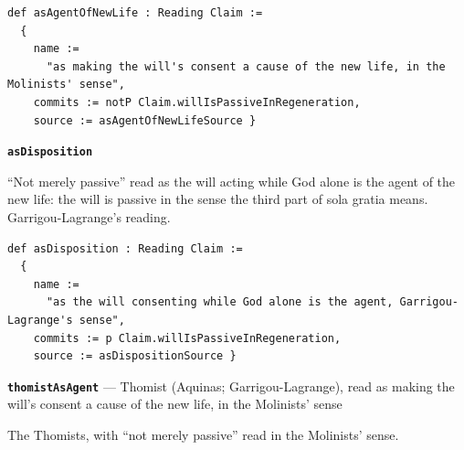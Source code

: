 \documentclass[11pt]{article}
\begin{document}
{\small\begin{verbatim}
def asAgentOfNewLife : Reading Claim :=
  {
    name :=
      "as making the will's consent a cause of the new life, in the Molinists' sense",
    commits := notP Claim.willIsPassiveInRegeneration,
    source := asAgentOfNewLifeSource }
\end{verbatim}}
\par\medskip\noindent\textbf{\texttt{as\allowbreak{}Disposition}}\par\nobreak\noindent
“Not merely passive” read as the will acting while God alone is the agent of the new life: the will is passive in the sense the third part of sola gratia means. Garrigou-Lagrange’s reading.

{\small\begin{verbatim}
def asDisposition : Reading Claim :=
  {
    name :=
      "as the will consenting while God alone is the agent, Garrigou-Lagrange's sense",
    commits := p Claim.willIsPassiveInRegeneration,
    source := asDispositionSource }
\end{verbatim}}
\par\medskip\noindent\textbf{\texttt{thomist\allowbreak{}As\allowbreak{}Agent}} --- Thomist (Aquinas; Garrigou-Lagrange), read as making the will’s consent a cause of the new life, in the Molinists’ sense\par\nobreak\noindent
The Thomists, with “not merely passive” read in the Molinists’ sense.
\end{document}
